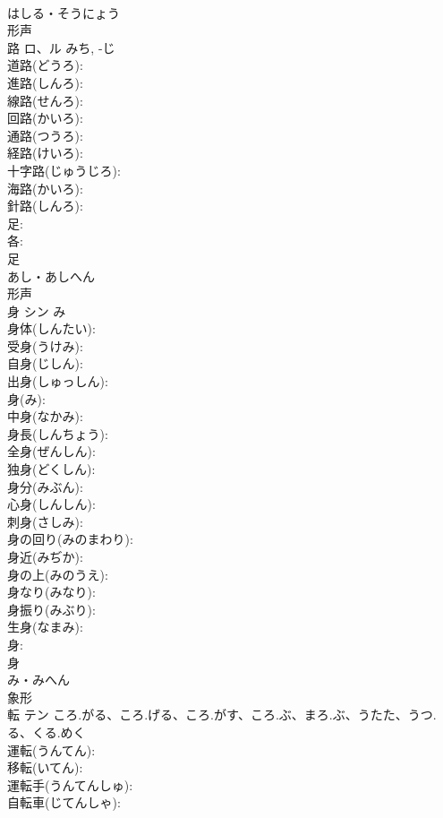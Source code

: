 \documentclass[8pt]{extreport}
\begin{document}
\begin{CJK}{UTF8}{min}
\\	はしる・そうにょう	
\\	形声 
\\	路	ロ、ル	みち, -じ		
\\	道路(どうろ): 
\\	進路(しんろ): 
\\	線路(せんろ): 
\\	回路(かいろ): 
\\	通路(つうろ): 
\\	経路(けいろ): 
\\	十字路(じゅうじろ): 
\\	海路(かいろ): 
\\	針路(しんろ): 
\\	足: 
\\	各: 
\\	足	
\\	あし・あしへん	
\\	形声 
\\	身	シン	み		
\\	身体(しんたい): 
\\	受身(うけみ): 
\\	自身(じしん): 
\\	出身(しゅっしん): 
\\	身(み): 
\\	中身(なかみ): 
\\	身長(しんちょう): 
\\	全身(ぜんしん): 
\\	独身(どくしん): 
\\	身分(みぶん): 
\\	心身(しんしん): 
\\	刺身(さしみ): 
\\	身の回り(みのまわり): 
\\	身近(みぢか): 
\\	身の上(みのうえ): 
\\	身なり(みなり): 
\\	身振り(みぶり): 
\\	生身(なまみ): 
\\	身: 
\\	身	
\\	み・みへん	
\\	象形 
\\	転	テン	ころ.がる、ころ.げる、ころ.がす、ころ.ぶ、まろ.ぶ、うたた、うつ.る、くる.めく		
\\	運転(うんてん): 
\\	移転(いてん): 
\\	運転手(うんてんしゅ): 
\\	自転車(じてんしゃ): 

\end{CJK}
\end{document}
